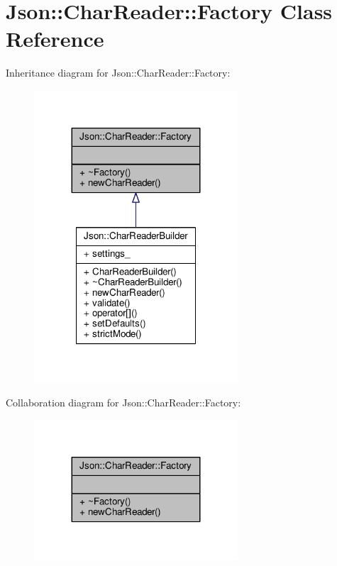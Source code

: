 \hypertarget{classJson_1_1CharReader_1_1Factory}{}\section{Json\+:\+:Char\+Reader\+:\+:Factory Class Reference}
\label{classJson_1_1CharReader_1_1Factory}


Inheritance diagram for Json\+:\+:Char\+Reader\+:\+:Factory\+:
\nopagebreak
\begin{figure}[H]
\begin{center}
\leavevmode
\includegraphics[width=215pt]{d7/d70/classJson_1_1CharReader_1_1Factory__inherit__graph}
\end{center}
\end{figure}


Collaboration diagram for Json\+:\+:Char\+Reader\+:\+:Factory\+:
\nopagebreak
\begin{figure}[H]
\begin{center}
\leavevmode
\includegraphics[width=215pt]{da/d0d/classJson_1_1CharReader_1_1Factory__coll__graph}
\end{center}
\end{figure}
